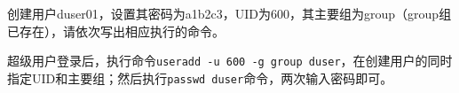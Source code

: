 \question[10] 创建用户duser01，设置其密码为a1b2c3，UID为600，其主要组为group（group组已存在），请依次写出相应执行的命令。

\vspace*{5cm}

\begin{solution}
超级用户登录后，执行命令\verb|useradd -u 600 -g group duser|，在创建用户的同时指定UID和主要组；然后执行\verb|passwd duser|命令，两次输入密码即可。
\end{solution}
